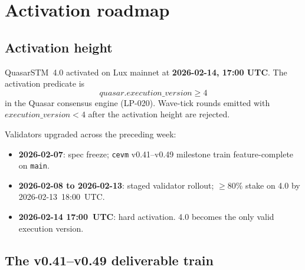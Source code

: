 \section{Activation roadmap}

\label{sec:activation}

\subsection{Activation height}

QuasarSTM~4.0 activated on Lux mainnet at \textbf{2026-02-14, 17:00
UTC}. The activation predicate is
\[
\mathit{quasar.execution\_version} \geq 4
\]
in the Quasar consensus engine (LP-020). Wave-tick rounds emitted with
$\mathit{execution\_version} < 4$ after the activation height are
rejected.

Validators upgraded across the preceding week:

\begin{itemize}[leftmargin=2em]
\item \textbf{2026-02-07}: spec freeze; \texttt{cevm} v0.41--v0.49
      milestone train feature-complete on \texttt{main}.
\item \textbf{2026-02-08 to 2026-02-13}: staged validator rollout;
      $\geq 80\%$ stake on 4.0 by 2026-02-13~18:00~UTC.
\item \textbf{2026-02-14 17:00~UTC}: hard activation. 4.0 becomes the
      only valid execution version.
\end{itemize}

\subsection{The v0.41--v0.49 deliverable train}

